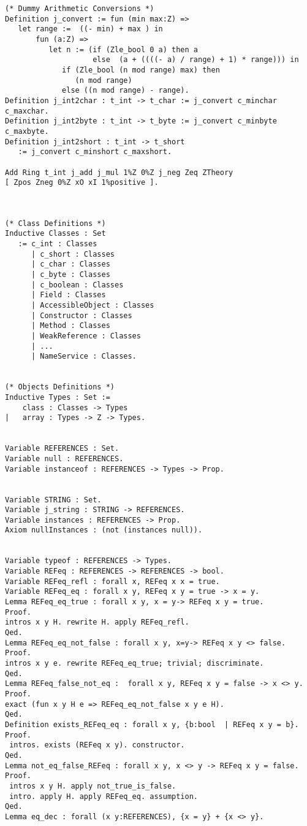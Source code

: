 \begin{verbatim}
(* Dummy Arithmetic Conversions *)
Definition j_convert := fun (min max:Z) =>
   let range :=  ((- min) + max ) in
       fun (a:Z) => 
          let n := (if (Zle_bool 0 a) then a
                    else  (a + ((((- a) / range) + 1) * range))) in
             if (Zle_bool (n mod range) max) then
                (n mod range)
             else ((n mod range) - range).
Definition j_int2char : t_int -> t_char := j_convert c_minchar c_maxchar.
Definition j_int2byte : t_int -> t_byte := j_convert c_minbyte c_maxbyte.
Definition j_int2short : t_int -> t_short 
   := j_convert c_minshort c_maxshort.

Add Ring t_int j_add j_mul 1%Z 0%Z j_neg Zeq ZTheory
[ Zpos Zneg 0%Z xO xI 1%positive ].



(* Class Definitions *)
Inductive Classes : Set
   := c_int : Classes
      | c_short : Classes
      | c_char : Classes
      | c_byte : Classes
      | c_boolean : Classes
      | Field : Classes
      | AccessibleObject : Classes
      | Constructor : Classes
      | Method : Classes
      | WeakReference : Classes
      | ...
      | NameService : Classes.


(* Objects Definitions *)
Inductive Types : Set :=
    class : Classes -> Types 
|   array : Types -> Z -> Types.


Variable REFERENCES : Set.
Variable null : REFERENCES.
Variable instanceof : REFERENCES -> Types -> Prop.


Variable STRING : Set.
Variable j_string : STRING -> REFERENCES.
Variable instances : REFERENCES -> Prop.
Axiom nullInstances : (not (instances null)).


Variable typeof : REFERENCES -> Types.
Variable REFeq : REFERENCES -> REFERENCES -> bool.
Variable REFeq_refl : forall x, REFeq x x = true. 
Variable REFeq_eq : forall x y, REFeq x y = true -> x = y. 
Lemma REFeq_eq_true : forall x y, x = y-> REFeq x y = true.
Proof.
intros x y H. rewrite H. apply REFeq_refl.
Qed. 
Lemma REFeq_eq_not_false : forall x y, x=y-> REFeq x y <> false.
Proof.
intros x y e. rewrite REFeq_eq_true; trivial; discriminate.
Qed. 
Lemma REFeq_false_not_eq :  forall x y, REFeq x y = false -> x <> y.
Proof.
exact (fun x y H e => REFeq_eq_not_false x y e H).
Qed. 
Definition exists_REFeq_eq : forall x y, {b:bool  | REFeq x y = b}.
Proof.
 intros. exists (REFeq x y). constructor.
Qed. 
Lemma not_eq_false_REFeq : forall x y, x <> y -> REFeq x y = false.
Proof.
 intros x y H. apply not_true_is_false.
 intro. apply H. apply REFeq_eq. assumption.
Qed. 
Lemma eq_dec : forall (x y:REFERENCES), {x = y} + {x <> y}.


\end{verbatim}
